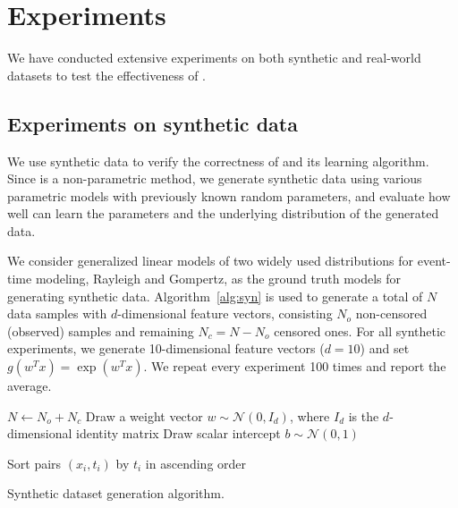 \section{Experiments}\label{sec:results}

We have conducted extensive experiments on both synthetic and real-world datasets to test the effectiveness of \npglm.

\subsection{Experiments on synthetic data}
We use synthetic data to verify the correctness of \npglm and its learning algorithm. Since \npglm is a non-parametric method, we generate synthetic data using various parametric models with previously known random parameters, and evaluate how well \npglm can learn the parameters and the underlying distribution of the generated data.

We consider generalized linear models of two widely used distributions for event-time modeling, Rayleigh and Gompertz, as the ground truth models for generating synthetic data. Algorithm~\ref{alg:syn} is used to generate a total of $N$ data samples with $d$-dimensional feature vectors, consisting $N_o$ non-censored (observed) samples and remaining $N_c=N-N_o$ censored ones. For all synthetic experiments, we generate 10-dimensional feature vectors ($d=10$) and set $g(w^Tx)=\exp(w^Tx)$. We repeat every experiment 100 times and report the average.

\begin{algorithm}[t]
	\small
	\SetAlgoLined
	$N\leftarrow N_o+N_c$\;
	Draw a weight vector $w\sim\mathcal{N}(0,I_d)$, where $I_d$ is the $d$-dimensional identity matrix\;
	Draw scalar intercept $b\sim\mathcal{N}(0,1)$\;
	
	Sort pairs $(x_i,t_i)$ by $t_i$ in ascending order\;
	
	\caption{Synthetic dataset generation algorithm.}
	\label{alg:syn}
\end{algorithm}


